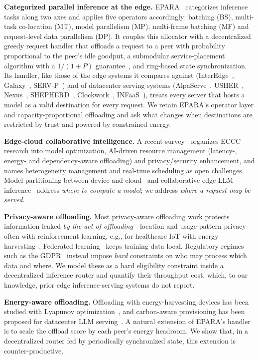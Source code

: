 \documentclass{article}
\begin{document}
\textbf{Categorized parallel inference at the edge.}
EPARA~\cite{epara2025} categorizes inference tasks along two axes and applies five operators accordingly: batching (BS), multi-task co-location (MT), model parallelism (MP), multi-frame batching (MF) and request-level data parallelism (DP). It couples this allocator with a decentralized greedy request handler that offloads a request to a peer with probability proportional to the peer's idle goodput, a submodular service-placement algorithm with a $1/(1+P)$ guarantee~\cite{fisher1978submodular}, and ring-based state synchronization. Its handler, like those of the edge systems it compares against (InterEdge~\cite{interedge}, Galaxy~\cite{galaxy}, SERV-P~\cite{servp}) and of datacenter serving systems (AlpaServe~\cite{alpaserve}, USHER~\cite{usher}, Nexus~\cite{nexus}, SHEPHERD~\cite{shepherd}, Clockwork~\cite{clockwork}, INFaaS~\cite{infaas}), treats every server that hosts a model as a valid destination for every request. We retain EPARA's operator layer and capacity-proportional offloading and ask what changes when destinations are restricted by trust and powered by constrained energy.

\textbf{Edge-cloud collaborative intelligence.}
A recent survey~\cite{liu2025eccc} organizes ECCC research into model optimization, AI-driven resource management (latency-, energy- and dependency-aware offloading) and privacy/security enhancement, and names heterogeneity management and real-time scheduling as open challenges. Model partitioning between device and cloud~\cite{neurosurgeon} and collaborative edge LLM inference~\cite{edgeshard} address \emph{where to compute a model}; we address \emph{where a request may be served}.

\textbf{Privacy-aware offloading.}
Most privacy-aware offloading work protects information leaked \emph{by the act of offloading}---location and usage-pattern privacy---often with reinforcement learning, e.g., for healthcare IoT with energy harvesting~\cite{min2019privacy}. Federated learning~\cite{mcmahan2017fl} keeps training data local. Regulatory regimes such as the GDPR~\cite{gdpr} instead impose \emph{hard} constraints on who may process which data and where. We model these as a hard eligibility constraint inside a decentralized inference router and quantify their throughput cost, which, to our knowledge, prior edge inference-serving systems do not report.

\textbf{Energy-aware offloading.}
Offloading with energy-harvesting devices has been studied with Lyapunov optimization~\cite{mao2016harvest}, and carbon-aware provisioning has been proposed for datacenter LLM serving~\cite{ecoserve}. A natural extension of EPARA's handler is to scale the offload score by each peer's energy headroom. We show that, in a decentralized router fed by periodically synchronized state, this extension is counter-productive.
\end{document}
